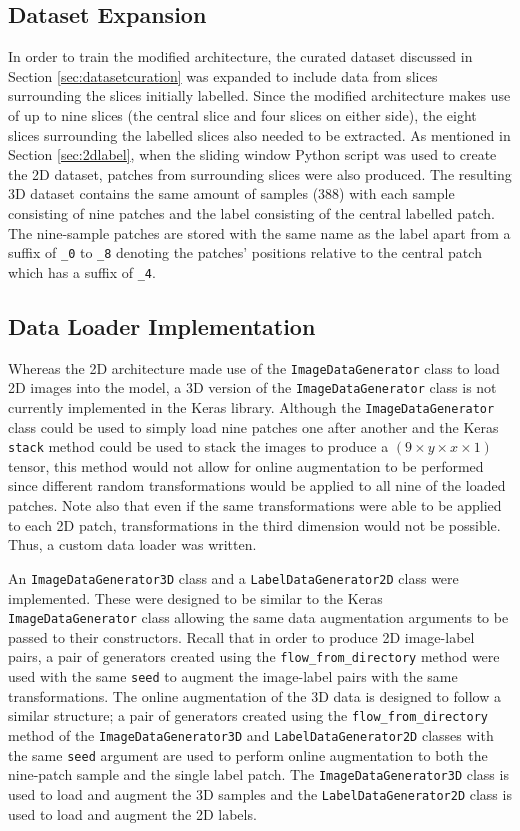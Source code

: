 \subsection{Dataset Expansion}

In order to train the modified architecture, the curated dataset discussed in Section \ref{sec:datasetcuration} was expanded to include data from slices surrounding the slices initially labelled. Since the modified architecture makes use of up to nine slices (the central slice and four slices on either side), the eight slices surrounding the labelled slices also needed to be extracted. As mentioned in Section \ref{sec:2dlabel}, when the sliding window Python script was used to create the 2D dataset, patches from surrounding slices were also produced. The resulting 3D dataset contains the same amount of samples (388) with each sample consisting of nine patches and the label consisting of the central labelled patch. The nine-sample patches are stored with the same name as the label apart from a suffix of \texttt{\_0} to \texttt{\_8} denoting the patches' positions relative to the central patch which has a suffix of \texttt{\_4}.

\subsection{Data Loader Implementation}

Whereas the 2D architecture made use of the \texttt{ImageDataGenerator} class to load 2D images into the model, a 3D version of the \texttt{ImageDataGenerator} class is not currently implemented in the Keras library. Although the \texttt{ImageDataGenerator} class could be used to simply load nine patches one after another and the Keras \texttt{stack} method could be used to stack the images to produce a $(9 \times y \times x \times 1)$ tensor, this method would not allow for online augmentation to be performed since different random transformations would be applied to all nine of the loaded patches. Note also that even if the same transformations were able to be applied to each 2D patch, transformations in the third dimension would not be possible. Thus, a custom data loader was written.

An \texttt{ImageDataGenerator3D} class and a \texttt{LabelDataGenerator2D} class were implemented. These were designed to be similar to the Keras \texttt{ImageDataGenerator} class allowing the same data augmentation arguments to be passed to their constructors. Recall that in order to produce 2D image-label pairs, a pair of generators created using the \texttt{flow\_from\_directory} method were used with the same \texttt{seed} to augment the image-label pairs with the same transformations. The online augmentation of the 3D data is designed to follow a similar structure; a pair of generators created using the \texttt{flow\_from\_directory} method of the \texttt{ImageDataGenerator3D} and \texttt{LabelDataGenerator2D} classes with the same \texttt{seed} argument are used to perform online augmentation to both the nine-patch sample and the single label patch. The \texttt{ImageDataGenerator3D} class is used to load and augment the 3D samples and the \texttt{LabelDataGenerator2D} class is used to load and augment the 2D labels.

